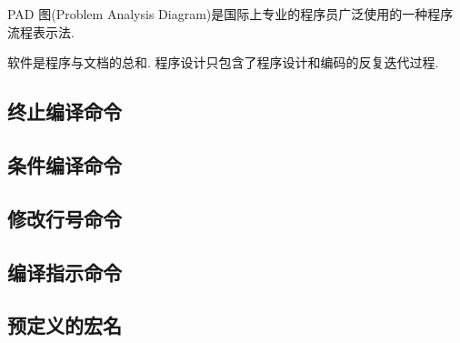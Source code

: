 PAD 图(Problem Analysis Diagram)是国际上专业的程序员广泛使用的一种程序流程表示法.

软件是程序与文档的总和. 程序设计只包含了程序设计和编码的反复迭代过程.

\subsection{终止编译命令}

\subsection{条件编译命令}

\subsection{修改行号命令}

\subsection{编译指示命令}

\subsection{预定义的宏名}
